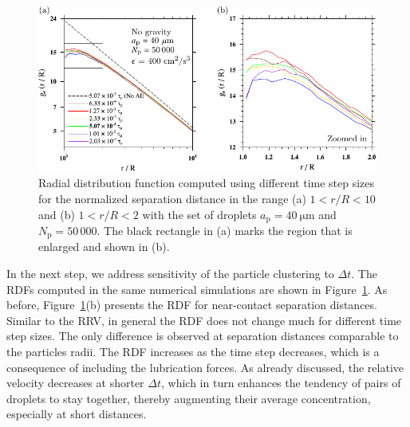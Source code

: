 \documentclass[../thesis.tex]{subfiles}
\begin{document}
\begin{figure}%
\center
\includegraphics[width=\textwidth]{../figs/JFM/fig4.pdf}
\caption{Radial distribution function computed using different time step sizes
for the normalized separation distance in the range (a) $1 < r/R < 10$ and (b) $1 < r/R < 2$
 with the set of droplets $a_\mathrm{p} = 40~\mathrm{\mu m}$ and $N_\mathrm{p} = 50\,000$.
The black rectangle in (a) marks the region that is enlarged and shown in (b).}
\label{Fig4}
\end{figure}%

In the next step, we address sensitivity of the particle clustering to $\Delta t$. The RDFs computed in the same numerical simulations are shown in Figure~\ref{Fig4}. As before, Figure~\ref{Fig4}(b) presents the RDF for near-contact separation distances. Similar to the RRV, in general the RDF does not change much for different time step sizes. The only difference is observed at separation distances comparable to the particles radii. The RDF increases as the time step decreases, which is a consequence of including the lubrication forces. As already discussed, the relative velocity decreases at shorter $\Delta t$, which in turn enhances the tendency of pairs of droplets to stay together, thereby augmenting their average concentration, especially at short distances.
\end{document}
